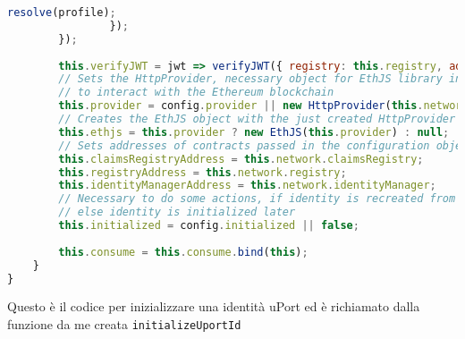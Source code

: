 \begin{lstlisting}[language=JavaScript, numbers=none]
                    resolve(profile);
                });
        });
    
        this.verifyJWT = jwt => verifyJWT({ registry: this.registry, address: this.mnid }, jwt);
        // Sets the HttpProvider, necessary object for EthJS library in order 
        // to interact with the Ethereum blockchain
        this.provider = config.provider || new HttpProvider(this.network.rpcUrl);
        // Creates the EthJS object with the just created HttpProvider as a parameter
        this.ethjs = this.provider ? new EthJS(this.provider) : null;
        // Sets addresses of contracts passed in the configuration object
        this.claimsRegistryAddress = this.network.claimsRegistry;
        this.registryAddress = this.network.registry;
        this.identityManagerAddress = this.network.identityManager;
        // Necessary to do some actions, if identity is recreated from MongoDB config.initialized has a value,
        // else identity is initialized later
        this.initialized = config.initialized || false;
    
        this.consume = this.consume.bind(this);
    }
}
\end{lstlisting}

Questo è il codice per inizializzare una identità uPort ed è richiamato dalla funzione da me
creata \texttt{initializeUportId}

